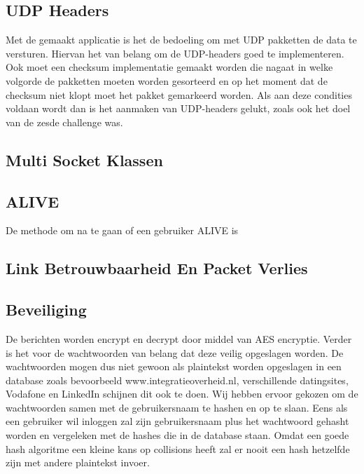 \documentclass[12pt]{article}
\begin{document}
\subsection{UDP Headers}
Met de gemaakt applicatie is het de bedoeling om met UDP pakketten de data te versturen. Hiervan het van belang om de UDP-headers goed te implementeren. Ook moet een checksum implementatie gemaakt worden die nagaat in welke volgorde de pakketten moeten worden gesorteerd en op het moment dat de checksum niet klopt moet het pakket gemarkeerd worden. Als aan deze condities voldaan wordt dan is het aanmaken van UDP-headers gelukt, zoals ook het doel van de zesde challenge was. 

\subsection{Multi Socket Klassen}


\subsection{ALIVE}
De methode om na te gaan of een gebruiker ALIVE is 

\subsection{Link Betrouwbaarheid En Packet Verlies}


\subsection{Beveiliging}
De berichten worden encrypt en decrypt door middel van AES encryptie. Verder is het voor de wachtwoorden van belang dat deze veilig opgeslagen worden. De wachtwoorden mogen dus niet gewoon als plaintekst worden opgeslagen in een database zoals bevoorbeeld www.integratieoverheid.nl, verschillende datingsites, Vodafone en LinkedIn schijnen dit ook te doen. Wij hebben ervoor gekozen om de wachtwoorden samen met de gebruikersnaam te hashen en op te slaan. Eens als een gebruiker wil inloggen zal zijn gebruikersnaam plus het wachtwoord gehasht worden en vergeleken met de hashes die in de database staan. Omdat een goede hash algoritme een kleine kans op collisions heeft zal er nooit een hash hetzelfde zijn met andere plaintekst invoer.
\end{document}
